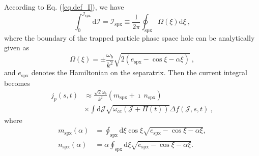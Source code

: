 According to Eq. (\ref{eq.def_I}), we have
\begin{equation}
    \int^{\mathcal{I}_\mathrm{s p x}}_0 \mathrm{d}\mathcal{I} = \mathcal{I}_\mathrm{s p x} \equiv {\frac{1}{2\pi}} \oint_\mathrm{s p x} \Omega (\xi) \mathrm{d} \xi~,
\end{equation}
where the boundary of the trapped particle phase space hole can be analytically given as
\begin{equation}\label{eq.bound}
    \Omega(\xi) = \pm \frac{\omega_b}{k^2} \sqrt{2 (e_\mathrm{spx}-\cos \xi - \alpha \xi)}~,
\end{equation}
and $e_\mathrm{spx}$ denotes the Hamiltonian on the separatrix.
Then the current integral becomes  
\begin{equation}\label{eq.adi_J}
    \begin{aligned}
    j_p(s,t) & \approx \frac{\sqrt{2} \omega_b}{k^2}  \left(m_\mathrm{s p x}+\imath ~ n_\mathrm{s p x}\right) \\
    & \times  \int \mathrm{d} \mathcal{J} \sqrt{ \omega_{c e}(\mathcal{J}+\Pi(t))} \Delta f(\mathcal{J},s,t) ~,
    \end{aligned}
\end{equation}
where
\begin{equation}\label{eq.function}
    \begin{aligned}
        m_\mathrm{spx}(\alpha) & = \oint_\mathrm{s p x} \mathrm{d} \xi \cos \xi \sqrt{e_\mathrm{s p x}-\cos \xi-\alpha \xi}, 
        \\
        n_\mathrm{spx}(\alpha) &  = \alpha \oint_\mathrm{s p x} \mathrm{d} \xi \sqrt{e_\mathrm{s p x}-\cos \xi-\alpha \xi}.
    \end{aligned}
\end{equation}
